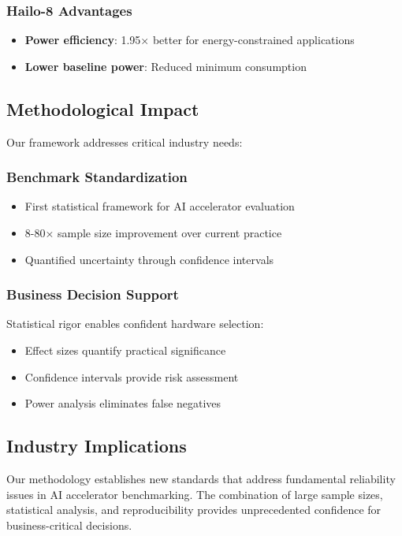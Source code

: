 \documentclass[sigconf]{acmart}
\begin{document}
\subsubsection{Hailo-8 Advantages}
\begin{itemize}
    \item \textbf{Power efficiency}: 1.95× better for energy-constrained applications
    \item \textbf{Lower baseline power}: Reduced minimum consumption
\end{itemize}

\subsection{Methodological Impact}

Our framework addresses critical industry needs:

\subsubsection{Benchmark Standardization}
\begin{itemize}
    \item First statistical framework for AI accelerator evaluation
    \item 8-80× sample size improvement over current practice
    \item Quantified uncertainty through confidence intervals
\end{itemize}

\subsubsection{Business Decision Support}
Statistical rigor enables confident hardware selection:
\begin{itemize}
    \item Effect sizes quantify practical significance
    \item Confidence intervals provide risk assessment
    \item Power analysis eliminates false negatives
\end{itemize}

\subsection{Industry Implications}

Our methodology establishes new standards that address fundamental reliability issues in AI accelerator benchmarking. The combination of large sample sizes, statistical analysis, and reproducibility provides unprecedented confidence for business-critical decisions.
\end{document}
